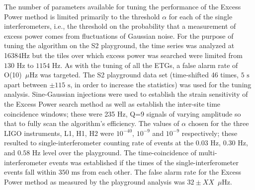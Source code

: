 
The number of parameters available for tuning the performance of the
Excess Power method is limited primarily to the threshold $\alpha$ for
each of the single interferometers, i.e., the threshold on the
probability that a measurement of excess power comes from fluctuations
of Gaussian noise.  For the purpose of tuning the algorithm on the S2
playground, the time series was analyzed at 16384Hz but the tiles over
which excess power was searched were limited from $130 \textrm{ Hz}$
to $1154 \textrm{ Hz}$.  As with the tuning of all the ETGs, a false
alarm rate of O(10)~$\mu$Hz was targeted.  The S2 playground data set
(time-shifted 46 times, $5 \textrm{ s}$ apart between $\pm 115
\textrm{ s}$, in order to increase the statistics) was used for the
tuning analysis.  Sine-Gaussian injections were used to establish the
strain sensitivity of the Excess Power search method as well as
establish the inter-site time coincidence windows; these were 235 Hz,
Q=9 signals of varying amplitude so that to fully scan the algorithm's
efficiency.  The values of $\alpha$ chosen for the three LIGO
instruments, L1, H1, H2 were $10^{-40}$,  $10^{-9}$ and $10^{-9}$
respectively; these resulted to single-interferometer counting rate of
events at the $0.03 \textrm{ Hz}$,  $0.30 \textrm{ Hz}$, and $0.58
\textrm{ Hz}$ level over the playground.  The time-coincidence of
multi-interferometer events was established if the times of the
single-interferometer events fall within $350 \textrm{ ms}$ from each
other.  The false alarm rate for the Excess Power method as measured
by the playground analysis was $32 \pm XX$~$\mu$Hz.



